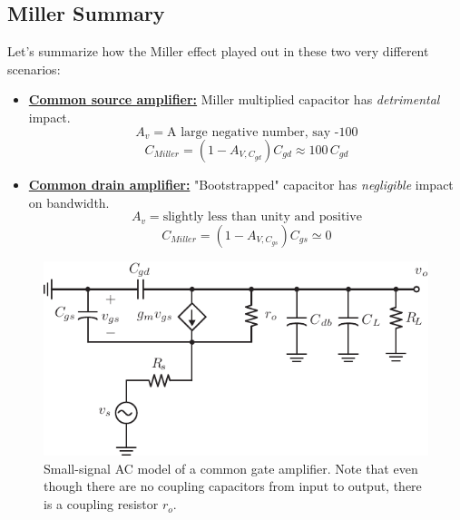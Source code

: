 \subsection{Miller Summary}
Let's summarize how the Miller effect played out in these two very different scenarios:
\vspace{0.5cm}
    \begin{itemize}[topsep=8pt,itemsep=4pt,partopsep=4pt, parsep=4pt]
        \item
        {\underline{\textbf{Common source amplifier:}}  Miller multiplied capacitor has \textit{detrimental} impact.
            \[A_v = \text{A large negative number, say -100}\]
            \[\boxed{C_{Miller} = (1 - A_{V,{C_{gd}}})C_{gd} \approx 100\,C_{gd}}\]
        }
        \item
        {\underline{\textbf{Common drain amplifier:}}  "Bootstrapped" capacitor has \textit{negligible} impact on bandwidth.
            \[A_v = \text{slightly less than unity and positive}\]
            \[\boxed{C_{Miller} = (1 - A_{V,{C_{gs}}})C_{gs} \simeq 0}\]
        }
    \end{itemize}
\newpage
\begin{figure}[t]
\centering
\includegraphics[scale=1.25]{amp_cg_ss}
\caption{Small-signal AC model of a common gate amplifier.  Note that even though there are no coupling capacitors from input to output, there is a coupling resistor $r_o$.}
\label{fig:cg_amp_caps}
\end{figure}
